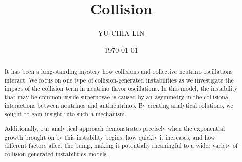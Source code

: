 \documentclass[aps,prd,twocolumn,amsmath,amssymb,groupedaddress]{revtex4-2}
\begin{document}

\title{Collision}


\author{YU-CHIA LIN}

\date{\today}

\begin{abstract}
It has been a long-standing mystery how collisions and collective neutrino oscillations interact. We focus on one type of collision-generated instabilities as we investigate the impact of the collision term in neutrino flavor oscillations. In this model, the instability that may be common inside supernovae is caused by an asymmetry in the collisional interactions between neutrinos and antineutrinos. By creating analytical solutions, we sought to gain insight into such a mechanism. 

Additionally, our analytical approach demonstrates precisely when the exponential growth brought on by this instability begins, how quickly it increases, and how different factors affect the bump, making it potentially meaningful to a wider variety of collision-generated instabilities models.
\end{abstract}
\end{document}
